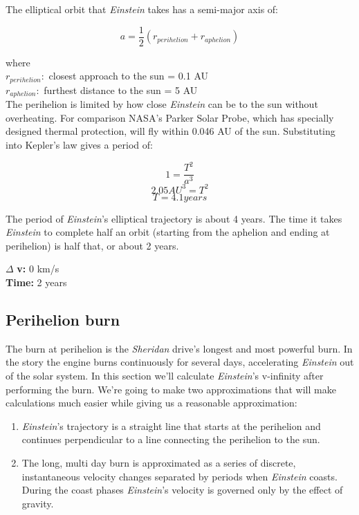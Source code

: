 \documentclass[12pt]{article} %
\begin{document}
The elliptical orbit that \textit{Einstein} takes has a semi-major axis of:

$$a = \frac{1}{2}(r_{perihelion} + r_{aphelion})$$

where\\
$r_{perihelion}:$ closest approach to the sun = 0.1 AU\\
$r_{aphelion}:$ furthest distance to the sun = 5 AU\\

The perihelion is limited by how close \textit{Einstein} can be to the sun without overheating. For comparison NASA's Parker Solar Probe, which has specially designed thermal protection, will fly within 0.046 AU of the sun. Substituting into Kepler's law gives a period of:

$$1 = \frac{T^2}{a^3}$$
$$2.05AU^{3} = T^2$$
$$T = 4.1 years$$

The period of \textit{Einstein}'s elliptical trajectory is about 4 years. The time it takes \textit{Einstein} to complete half an orbit (starting from the aphelion and ending at perihelion) is half that, or about 2 years.

$\Delta$ \textbf{v:} 0 km/s\\
\textbf{Time:} 2 years

\subsection{Perihelion burn}
The burn at perihelion is the \textit{Sheridan} drive's longest and most powerful burn. In the story the engine burns continuously for several days, accelerating \textit{Einstein} out of the solar system. In this section we'll calculate \textit{Einstein}'s v-infinity after performing the burn. We're going to make two approximations that will make calculations much easier while giving us a reasonable approximation:

\begin{enumerate}
\item \textit{Einstein}'s trajectory is a straight line that starts at the perihelion and continues perpendicular to a line connecting the perihelion to the sun.
\item The long, multi day burn is approximated as a series of discrete, instantaneous velocity changes separated by periods when \textit{Einstein} coasts. During the coast phases \textit{Einstein}'s velocity is governed only by the effect of gravity.
\end{enumerate}
\end{document}
